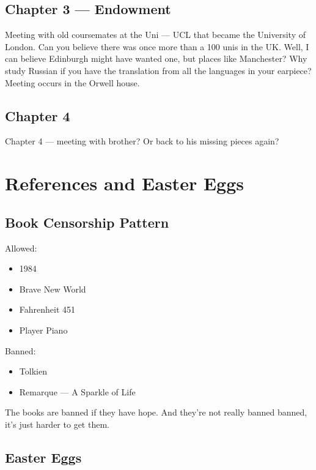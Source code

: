 \documentclass[12pt]{article}
\begin{document}
\subsection{Chapter 3 — Endowment}

Meeting with old coursemates at the Uni — UCL that became the University of London. Can you believe there was once more than a 100 unis in the UK. Well, I can believe Edinburgh might have wanted one, but places like Manchester? Why study Russian if you have the translation from all the languages in your earpiece? Meeting occurs in the Orwell house.

\subsection{Chapter 4}

Chapter 4 — meeting with brother? Or back to his missing pieces again?

\section{References and Easter Eggs}

\subsection{Book Censorship Pattern}

Allowed:
\begin{itemize}
  \item 1984
  \item Brave New World
  \item Fahrenheit 451
  \item Player Piano
\end{itemize}

Banned:
\begin{itemize}
  \item Tolkien
  \item Remarque — A Sparkle of Life
\end{itemize}

The books are banned if they have hope. And they’re not really banned banned, it’s just harder to get them.

\subsection{Easter Eggs}
\end{document}
